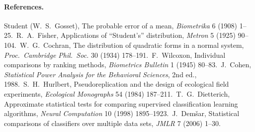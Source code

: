 \documentclass[11pt,a4paper]{article}
\begin{document}
\paragraph{References.}
Student (W.~S.~Gosset), The probable error of a mean, \emph{Biometrika} 6 (1908) 1--25.\
R.~A.~Fisher, Applications of ``Student's'' distribution, \emph{Metron} 5 (1925) 90--104.\
W.~G.~Cochran, The distribution of quadratic forms in a normal system, \emph{Proc.\ Cambridge Phil.\ Soc.} 30 (1934) 178--191.\
F.~Wilcoxon, Individual comparisons by ranking methods, \emph{Biometrics Bulletin} 1 (1945) 80--83.\
J.~Cohen, \emph{Statistical Power Analysis for the Behavioral Sciences}, 2nd ed., 1988.\
S.~H.~Hurlbert, Pseudoreplication and the design of ecological field experiments, \emph{Ecological Monographs} 54 (1984) 187--211.\
T.~G.~Dietterich, Approximate statistical tests for comparing supervised classification learning algorithms, \emph{Neural Computation} 10 (1998) 1895--1923.\
J.~Dem\v{s}ar, Statistical comparisons of classifiers over multiple data sets, \emph{JMLR} 7 (2006) 1--30.
\end{document}
